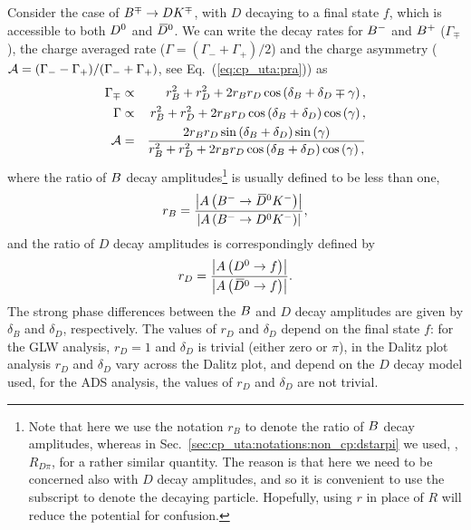 Consider the case of $B^\mp \to D K^\mp$,
with $D$ decaying to a final state $f$,
which is accessible to both $D^0$ and $\kern 0.2em\overline{\kern -0.2em D}{}^0$.
We can write the decay rates for $B^{-}$ and $B^{+}$ ($\Gamma_\mp$), 
the charge averaged rate ($\Gamma = (\Gamma_- + \Gamma_+)/2$)
and the charge asymmetry 
(${\cal A} = (\Gamma_- - \Gamma_+)/(\Gamma_- + \Gamma_+)$, see Eq.~(\ref{eq:cp_uta:pra})) as 
\begin{eqnarray}
  \label{eq:cp_uta:dk:rate_def}
  \Gamma_\mp  & \propto & 
  r_B^2 + r_D^2 + 2 r_B r_D \cos \left( \delta_B + \delta_D \mp \gamma \right), \\
  \label{eq:cp_uta:dk:av_rate_def}
  \Gamma & \propto &  
  r_B^2 + r_D^2 + 2 r_B r_D \cos \left( \delta_B + \delta_D \right) \cos \left( \gamma \right), \\
  \label{eq:cp_uta:dk:acp_def}
  {\cal A} & = & 
  \frac{
    2 r_B r_D \sin \left( \delta_B + \delta_D \right) \sin \left( \gamma \right)
  }{
    r_B^2 + r_D^2 + 2 r_B r_D \cos \left( \delta_B + \delta_D \right) \cos \left( \gamma \right),  
  }
\end{eqnarray}
where the ratio of $B$ decay amplitudes\footnote{
  Note that here we use the notation $r_B$ to denote the ratio
  of $B$ decay amplitudes, 
  whereas in Sec.~\ref{sec:cp_uta:notations:non_cp:dstarpi} 
  we used, \eg, $R_{D\pi}$, for a rather similar quantity.
  The reason is that here we need to be concerned also with 
  $D$ decay amplitudes,
  and so it is convenient to use the subscript to denote the decaying particle.
  Hopefully, using $r$ in place of $R$ will reduce the potential for confusion.
} 
is usually defined to be less than one,
\begin{equation}
  \label{eq:cp_uta:dk:rb_def}
  r_B = 
  \frac{
    \left| A\left( B^{-} \to \kern 0.2em\overline{\kern -0.2em D}{}^0 K^- \right) \right|
  }{
    \left| A\left( B^{-} \to D^0  K^- \right) \right|
  },
\end{equation}
and the ratio of $D$ decay amplitudes is correspondingly defined by
\begin{equation}
  \label{eq:cp_uta:dk:rd_def}
  r_D = 
  \frac{
    \left| A\left( D^0  \to f \right) \right|
  }{
    \left| A\left( \kern 0.2em\overline{\kern -0.2em D}{}^0 \to f \right) \right|
  }.
\end{equation}
The strong phase differences between the $B$ and $D$ decay amplitudes 
are given by $\delta_B$ and $\delta_D$, respectively.
The values of $r_D$ and $\delta_D$ depend on the final state $f$:
for the GLW analysis, $r_D = 1$ and $\delta_D$ is trivial (either zero or $\pi$),
in the Dalitz plot analysis $r_D$ and $\delta_D$ vary across the Dalitz plot,
and depend on the $D$ decay model used,
for the ADS analysis, the values of $r_D$ and $\delta_D$ are not trivial.

